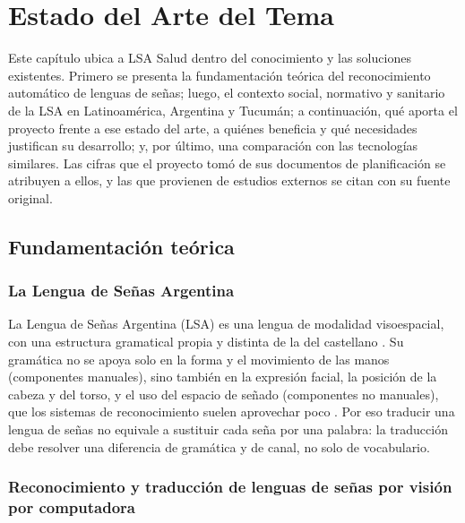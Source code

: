 \chapter{Estado del Arte del Tema}\label{cap:estado-arte}

Este capítulo ubica a LSA Salud dentro del conocimiento y las soluciones existentes. Primero se presenta la fundamentación teórica del reconocimiento automático de lenguas de señas; luego, el contexto social, normativo y sanitario de la LSA en Latinoamérica, Argentina y Tucumán; a continuación, qué aporta el proyecto frente a ese estado del arte, a quiénes beneficia y qué necesidades justifican su desarrollo; y, por último, una comparación con las tecnologías similares. Las cifras que el proyecto tomó de sus documentos de planificación se atribuyen a ellos, y las que provienen de estudios externos se citan con su fuente original.

\section{Fundamentación teórica}\label{sec:fundamentacion}

\subsection{La Lengua de Señas Argentina}

La Lengua de Señas Argentina (LSA) es una lengua de modalidad visoespacial, con una estructura gramatical propia y distinta de la del castellano \parencite{ley27710}. Su gramática no se apoya solo en la forma y el movimiento de las manos (componentes manuales), sino también en la expresión facial, la posición de la cabeza y del torso, y el uso del espacio de señado (componentes no manuales), que los sistemas de reconocimiento suelen aprovechar poco \parencite{koller2020survey}. Por eso traducir una lengua de señas no equivale a sustituir cada seña por una palabra: la traducción debe resolver una diferencia de gramática y de canal, no solo de vocabulario.

\subsection{Reconocimiento y traducción de lenguas de señas por visión por computadora}

